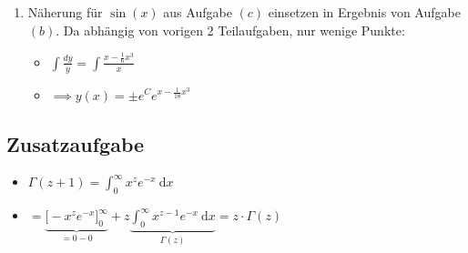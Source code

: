 \documentclass[11pt]{article}
\providecommand\d{}
\renewcommand{\d}[1]{\:\mathrm{d}{#1}}
\begin{document}
\begin{enumerate}
\begin{enumerate}
\item Näherung für $\sin(x)$ aus Aufgabe $(c)$ einsetzen in Ergebnis von Aufgabe $(b)$. Da abhängig von vorigen 2 Teilaufgaben, nur wenige Punkte:
\begin{itemize}
\item $\int\frac{dy}{y} = \int\frac{x-\frac{1}{6}x^3}{x}$
\item $\implies y(x) = \pm e^C e^{x-\frac{1}{18}x^3}$
\end{itemize}

\end{enumerate}

\end{enumerate}

\subsection*{Zusatzaufgabe}

\begin{itemize}
\item $\Gamma(z+1) = \int_0^\infty x^z e^{-x} \d x$
\item $= \underbrace{\big[ -x^z e^{-x}\big]_{0}^{\infty}}_{=0-0} + z \underbrace{\int_0^\infty x^{z-1}e^{-x}\d x}_{\Gamma(z)} = z\cdot\Gamma(z)$
\end{itemize}
\end{document}
